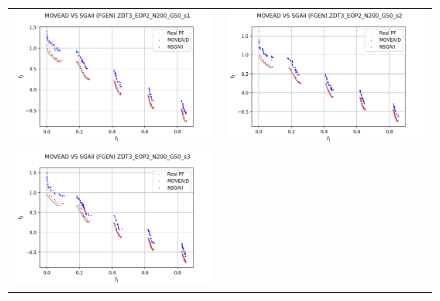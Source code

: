 \begin{figure}[H]
    \centering
    \begin{tabular}{c c}
    \includegraphics[scale=0.5]{figures/ZDT3_EOP2_N200_G50_T30/s1_comp.png} &
    \includegraphics[scale=0.5]{figures/ZDT3_EOP2_N200_G50_T30/s2_comp.png}\\
    \includegraphics[scale=0.5]{figures/ZDT3_EOP2_N200_G50_T30/s3_comp.png} &

\end{tabular}
\end{figure}
